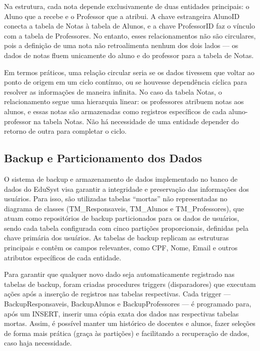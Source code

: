 \documentclass[main.tex]{subfiles}
\begin{document}
Na estrutura, cada nota depende exclusivamente de duas entidades principais: o Aluno que a recebe e o Professor que a atribui. A chave estrangeira Aluno\underline{\hspace{.10in}}ID conecta a tabela de Notas à tabela de Alunos, e a chave Professor\underline{\hspace{.10in}}ID faz o vínculo com a tabela de Professores. No entanto, esses relacionamentos não são circulares, pois a definição de uma nota não retroalimenta nenhum dos dois lados — os dados de notas fluem unicamente do aluno e do professor para a tabela de Notas.

Em termos práticos, uma relação circular seria se os dados tivessem que voltar ao ponto de origem em um ciclo contínuo, ou se houvesse dependência cíclica para resolver as informações de maneira infinita. No caso da tabela Notas, o relacionamento segue uma hierarquia linear: os professores atribuem notas aos alunos, e essas notas são armazenadas como registros específicos de cada aluno-professor na tabela Notas. Não há necessidade de uma entidade depender do retorno de outra para completar o ciclo.

\subsection{Backup e Particionamento dos Dados}
O sistema de backup e armazenamento de dados implementado no banco de dados do EduSyst visa garantir a integridade e preservação das informações dos usuários. Para isso, são utilizadas tabelas “mortas” não representadas no diagrama de classes (TM\_Responsaveis, TM\_Alunos e TM\_Professores), que atuam como repositórios de backup particionados para os dados de usuários, sendo cada tabela configurada com cinco partições proporcionais, definidas pela chave primária dos usuários. As tabelas de backup replicam as estruturas principais e contêm os campos relevantes, como CPF, Nome, Email e outros atributos específicos de cada entidade.

Para garantir que qualquer novo dado seja automaticamente registrado nas tabelas de backup, foram criadas procedures triggers (disparadores) que executam ações após a inserção de registros nas tabelas respectivas. Cada trigger — BackupResponsaveis, BackupAlunos e BackupProfessores — é programado para, após um INSERT, inserir uma cópia exata dos dados nas respectivas tabelas mortas. Assim, é possível manter um histórico de docentes e alunos, fazer seleções de forma mais prática (graça às partições) e facilitando a recuperação de dados, caso haja necessidade.
\end{document}
